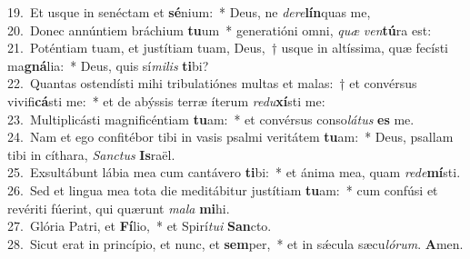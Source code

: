 {19.~}Et usque in senéctam et \textbf{sé}nium:~* Deus, ne \textit{de}\textit{re}\textbf{lín}quas me,\\
{20.~}Donec annúntiem bráchium \textbf{tu}um~* generatióni omni, \textit{quæ} \textit{ven}\textbf{tú}ra est:\\
{21.~}Poténtiam tuam, et justítiam tuam, Deus,~† usque in altíssima, quæ fecísti ma\textbf{gná}lia:~* Deus, quis sí\textit{mi}\textit{lis} \textbf{ti}bi?\\
{22.~}Quantas ostendísti mihi tribulatiónes multas et malas:~† et convérsus vivifi\textbf{cá}sti me:~* et de abýssis terræ íterum \textit{re}\textit{du}\textbf{xí}sti me:\\
{23.~}Multiplicásti magnificéntiam \textbf{tu}am:~* et convérsus conso\textit{lá}\textit{tus} \textbf{es} me.\\
{24.~}Nam et ego confitébor tibi in vasis psalmi veritátem \textbf{tu}am:~* Deus, psallam tibi in cíthara, \textit{San}\textit{ctus} \textbf{Is}raël.\\
{25.~}Exsultábunt lábia mea cum cantávero \textbf{ti}bi:~* et ánima mea, quam \textit{re}\textit{de}\textbf{mí}sti.\\
{26.~}Sed et lingua mea tota die meditábitur justítiam \textbf{tu}am:~* cum confúsi et revériti fúerint, qui quærunt \textit{ma}\textit{la} \textbf{mi}hi.\\
{27.~}Glória Patri, et \textbf{Fí}lio,~* et Spirí\textit{tu}\textit{i} \textbf{San}cto.\\
{28.~}Sicut erat in princípio, et nunc, et \textbf{sem}per,~* et in sǽcula sæcu\textit{ló}\textit{rum}. \textbf{A}men.\\
